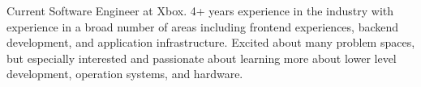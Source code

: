 

\begin{cvparagraph}

Current Software Engineer at Xbox. 4+ years experience in the industry with experience in a broad number of areas including frontend experiences, backend development, and application infrastructure. Excited about many problem spaces, but especially interested and passionate about learning more about lower level development, operation systems, and hardware.
\end{cvparagraph}
